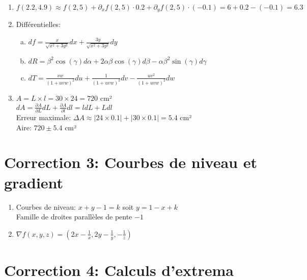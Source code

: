 \begin{enumerate}
    \item $f(2.2,4.9) \approx f(2,5) + \partial_x f(2,5)\cdot 0.2 + \partial_y f(2,5)\cdot (-0.1) = 6 + 0.2 - (-0.1) = 6.3$
    
    \item Différentielles:
    \begin{enumerate}[a)]
        \item $df = \frac{x}{\sqrt{x^2+3y^2}}dx + \frac{3y}{\sqrt{x^2+3y^2}}dy$
        \item $dR = \beta^2\cos(\gamma)d\alpha + 2\alpha\beta\cos(\gamma)d\beta - \alpha\beta^2\sin(\gamma)d\gamma$
        \item $dT = \frac{vw}{(1+uvw)^2}du + \frac{1}{(1+uvw)^2}dv - \frac{uv^2}{(1+uvw)^2}dw$
    \end{enumerate}
    
    \item $A = L\times l = 30\times 24 = 720$ cm²\\
    $dA = \frac{\partial A}{\partial L}dL + \frac{\partial A}{\partial l}dl = ldL + Ldl$\\
    Erreur maximale: $\Delta A \approx |24\times 0.1| + |30\times 0.1| = 5.4$ cm²\\
    Aire: $720 \pm 5.4$ cm²
\end{enumerate}

\section*{Correction 3: Courbes de niveau et gradient}

\begin{enumerate}
    \item Courbes de niveau: $x+y-1 = k$ soit $y = 1 - x + k$\\
    Famille de droites parallèles de pente $-1$
    
    \item $\nabla f(x,y,z) = \left(2x - \frac{1}{x}, 2y - \frac{1}{y}, -\frac{1}{z}\right)$
\end{enumerate}

\section*{Correction 4: Calculs d'extrema}

